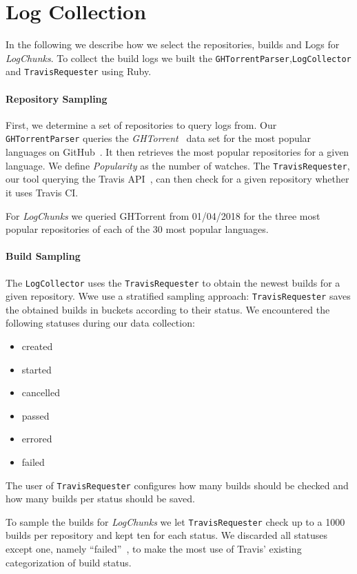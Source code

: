 \documentclass[\myrootdir/main.tex]{subfiles}
\begin{document}
\section{Log Collection}
In the following we describe how we select the repositories, builds and Logs for \emph{LogChunks}.
To collect the build logs we built the  \texttt{GHTorrentParser},\texttt{LogCollector} and \texttt{TravisRequester} using Ruby.

\paragraph{Repository Sampling}
First, we determine a set of repositories to query logs from.
Our \texttt{GHTorrentParser} queries the \emph{GHTorrent}~\cite{gousios2013ghtorrent} data set for the most popular languages on GitHub~\cite{github2019website}.
It then retrieves the most popular repositories for a given language.
We define \emph{Popularity} as the number of watches.
The \texttt{TravisRequester}, our tool querying the Travis API~\cite{travisci2019apidoc}, can then check for a given repository whether it uses Travis CI\@.

For \emph{LogChunks} we queried GHTorrent from 01/04/2018 for the three most popular repositories of each of the 30 most popular languages.

\paragraph{Build Sampling}
The \texttt{LogCollector} uses the \texttt{TravisRequester} to obtain the newest builds for a given repository.
Wwe use a stratified sampling approach: \texttt{TravisRequester} saves the obtained builds in buckets according to their status.
We encountered the following statuses during our data collection:
\begin{multicols}{3}
\begin{itemize}
	\item created
	\item started
	\item cancelled
	\item passed
	\item errored
	\item failed
\end{itemize}
\end{multicols}
The user of \texttt{TravisRequester} configures how many builds should be checked and how many builds per status should be saved.

To sample the builds for \emph{LogChunks} we let \texttt{TravisRequester} check up to a 1000 builds per repository and kept ten for each status.
We discarded all statuses except one, namely ``failed''~\cite{travis2009buildstatus}, to make the most use of Travis' existing categorization of build status.
\end{document}
